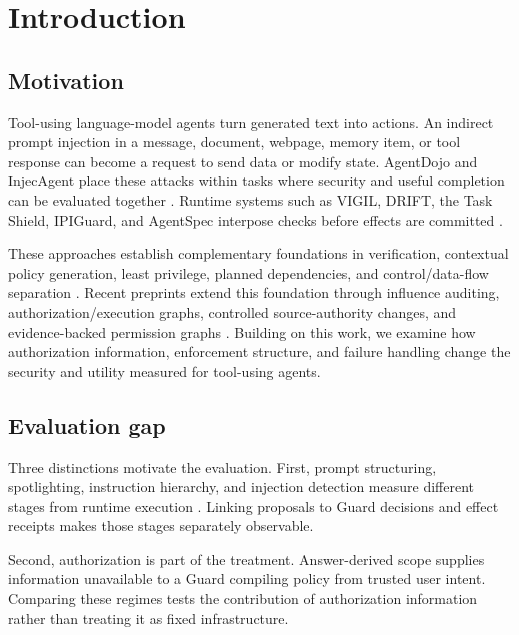 \section{Introduction}

\label{sec:introduction}

\subsection{Motivation}

\label{sec:introduction-motivation}

Tool-using language-model agents turn generated text into actions. An indirect prompt injection in a message, document, webpage, memory item, or tool response can become a request to send data or modify state. AgentDojo and InjecAgent place these attacks within tasks where security and useful completion can be evaluated together \citep{L09,L10}. Runtime systems such as VIGIL, DRIFT, the Task Shield, IPIGuard, and AgentSpec interpose checks before effects are committed \citep{L01,L02,L03,L20,L25}.

These approaches establish complementary foundations in verification, contextual policy generation, least privilege, planned dependencies, and control/data-flow separation \citep{L01,L08,L24,L25,L26}. Recent preprints extend this foundation through influence auditing, authorization/execution graphs, controlled source-authority changes, and evidence-backed permission graphs \citep{L21,L22,L35,L36}. Building on this work, we examine how authorization information, enforcement structure, and failure handling change the security and utility measured for tool-using agents.

\subsection{Evaluation gap}

\label{sec:introduction-evaluation-gap}

Three distinctions motivate the evaluation. First, prompt structuring, spotlighting, instruction hierarchy, and injection detection measure different stages from runtime execution \citep{L07,L30,L31,L32}. Linking proposals to Guard decisions and effect receipts makes those stages separately observable.

Second, authorization is part of the treatment. Answer-derived scope supplies information unavailable to a Guard compiling policy from trusted user intent. Comparing these regimes tests the contribution of authorization information rather than treating it as fixed infrastructure.

